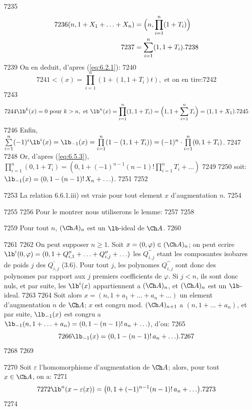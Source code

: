   7235	\begin{align*}
  7236	(n, 1+X_1+\ldots+X_n) &= \Bigl(n, \prod_{i=1}^{n}(1+T_i)\Bigr) \\
  7237	&= \sum_{i=1}^{n} (1, 1+T_i).
  7238	\end{align*}
  7239	On en deduit, d'apres (\ref{eq:6.2.1}):
  7240	\[
  7241	\lt(x) = \prod_{i=1}^{n} (1+(1, 1+T_i)t), \text{ et on en tire:}
  7242	\]
  7243	\[
  7244	\lb^k(x) = 0 \text{ pour } k > n, \text{ et } \lb^n(x) = \prod_{i=1}^{n}(1, 1+T_i) = \Bigl(1, 1+\sum_{i=1}^{n} T_i\Bigr) = (1, 1+X_1).
  7245	\]
  7246	Enfin, $\sum\limits_{i=1}^{n} (-1)^i \lb^i(x) = \lb_{-1}(x) = \prod\limits_{i=1}^{n}(1-(1, 1+T_i)) = (-1)^n \cdot \prod\limits_{i=1}^{n}(0, 1+T_i)$.
  7247	
  7248	Or, d'apres (\ref{eq:6.5.3}), $\prod\limits_{i=1}^{n}(0, 1+T_i) = (0, 1+(-1)^{n-1}(n-1)! \prod\limits_{i=1}^{n}T_i + \ldots)$
  7249	
  7250	soit: $\lb_{-1}(x) = (0, 1-(n-1)!\, X_n + \ldots)$.
  7251	
  7252	\begin{cor}[6.6.2]
  7253	La relation 6.6.1.iii) est vraie pour tout element $x$ d'augmentation $n$.
  7254	\end{cor}
  7255	
  7256	Pour le montrer nous utiliserons le lemme:
  7257	
  7258	\begin{lem}[6.6.3]
  7259	Pour tout $n$, $(\Ch A)_n$ est un $\lb$-ideal de $\Ch A$.
  7260	\end{lem}
  7261	
  7262	On peut supposer $n \geqslant 1$. Soit $x = (0, \varphi) \in (\Ch A)_n$; on peut ecrire $\lb^i(0, \varphi) = (0, 1+Q^{\prime\prime}_{i,1}+\ldots+Q^{\prime\prime}_{i,j}+\ldots)$ les $Q^{\prime\prime}_{i,j}$ etant les composantes isobares de poids $j$ des $Q^\prime_{i,j}$ (3.6). Pour tout $j$, les polynomes $Q^{\prime\prime}_{i,j}$ sont donc des polynomes par rapport aux $j$ premiers coefficients de $\varphi$. Si $j < n$, ils sont donc nuls, et par suite, les $\lb^i(x)$ appartiennent a $(\Ch A)_n$, et $(\Ch A)_n$ est un $\lb$-ideal.
  7263	
  7264	Soit alors $x = (n, 1+a_1+\ldots+a_n+\ldots)$ un element d'augmentation $n$ de $\Ch A$; $x$ est congru mod. $(\Ch A)_{n+1}$ a $(n, 1+\ldots+a_n)$, et par suite, $\lb_{-1}(x)$ est congru a $\lb_{-1}(n, 1+\ldots+a_n) = (0, 1-(n-1)!\, a_n + \ldots)$, d'ou:
  7265	\[
  7266	\lb_{-1}(x) = (0, 1-(n-1)!\, a_n + \ldots).
  7267	\]
  7268	
  7269	\begin{cor}[6.6.4]
  7270	Soit $\varepsilon$ l'homomorphisme d'augmentation de $\Ch A$; alors, pour tout $x \in \Ch A$, on a:
  7271	\[
  7272	\lb^n(x-\varepsilon(x)) = \bigl(0, 1+(-1)^{n-1}(n-1)!\, a_n + \ldots\bigr).
  7273	\]
  7274	\end{cor}
